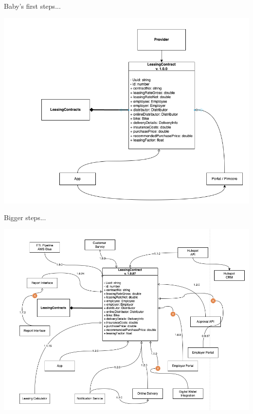 \begin{frame}{Baby's first steps...}
  \begin{center}
    \includegraphics[scale=.35]{./assets/model2}
  \end{center}
\end{frame}


\begin{frame}{Bigger steps...}
  \begin{center}
    \includegraphics[scale=.3]{./assets/model3}
  \end{center}
\end{frame}


